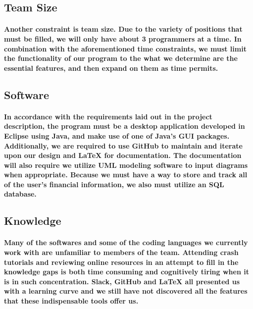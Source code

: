 \documentclass{article}
\begin{document}
\subsection{Team Size}
\paragraph{\indent Another constraint is team size. Due to the variety of positions that must be filled, we will only have about 3 programmers at a time. In combination with the aforementioned time constraints, we must limit the functionality of our program to the what we determine are the essential features, and then expand on them as time permits.}

\subsection{Software}
\paragraph{\indent In accordance with the requirements laid out in the project description, the program must be a desktop application developed in Eclipse using Java, and make use of one of Java's GUI packages. Additionally, we are required to use GitHub to maintain and iterate upon our design and LaTeX for documentation. The documentation will also require we utilize UML modeling software to input diagrams when appropriate. Because we must have a way to store and track all of the user's financial information, we also must utilize an SQL database.}

\subsection{Knowledge}
\paragraph{\indent Many of the softwares and some of the coding languages we currently work with are unfamiliar to members of the team. Attending crash tutorials and reviewing online resources in an attempt to fill in the knowledge gaps is both time consuming and cognitively tiring when it is in such concentration. Slack, GitHub and LaTeX all presented us with a learning curve and we still have not discovered all the features that these indispensable tools offer us.  }
\end{document}
